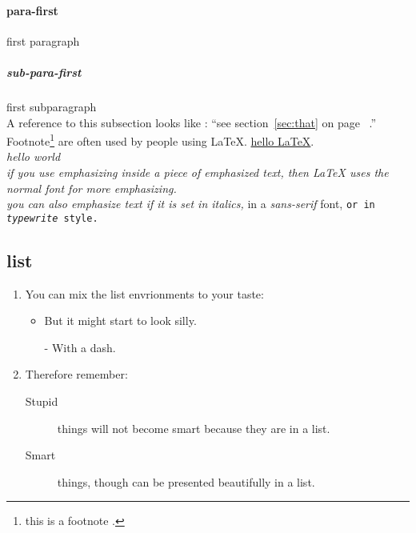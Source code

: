\documentclass[a4paper, 11pt]{article}
\begin{document}
\paragraph{para-first}
	first paragraph
\subparagraph{sub-para-first}
	first subparagraph\\

A reference to this subsection \label{sec:this} looks like :
``see section~\ref{sec:that} on page ~\pageref{sec:this}.''
Footnote\footnote{this is a footnote .} are often used by people using \LaTeX.
\underline{hello \LaTeX}.\\
\emph{hello world}\\
\emph{if you use emphasizing inside a piece of emphasized text, then \LaTeX{} uses the \emph{normal} font for more emphasizing.}\\
\textit{you can also \emph{emphasize} text if it is set in italics, }\textsf{in a \emph{sans-serif} font, } \texttt{or in \emph{typewrite} style.} \\

\subsection{list}
\flushleft
\begin{enumerate}
\item You can mix the list envrionments to your taste:
\begin{itemize}
\item But it might start to look silly.
\item[-] With a dash.
\end{itemize}
\item Therefore remember:
\begin{description}
\item[Stupid] things will not become smart because they are in a list.
\item[Smart] things, though can be presented beautifully in a list.
\end{description}
\end{enumerate}
\end{document}
